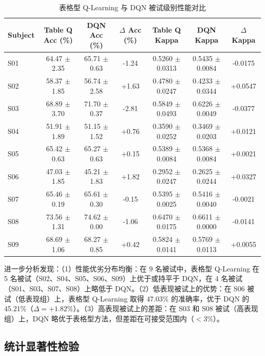 \begin{table}[H]
\centering
\caption{表格型 Q-Learning 与 DQN 被试级别性能对比}
\label{tab:subject_comparison}
\small
\begin{tabular}{lcccccc}
\hline
\textbf{Subject} & \textbf{Table Q Acc (\%)} & \textbf{DQN Acc (\%)} & \textbf{$\Delta$ Acc (\%)} & \textbf{Table Q Kappa} & \textbf{DQN Kappa} & \textbf{$\Delta$ Kappa} \\
\hline
S01 & 64.47 $\pm$ 2.35 & 65.71 $\pm$ 0.63 & -1.24 & 0.5260 $\pm$ 0.0313 & 0.5435 $\pm$ 0.0084 & -0.0175 \\
S02 & 58.37 $\pm$ 1.85 & 56.74 $\pm$ 2.58 & +1.63 & 0.4780 $\pm$ 0.0247 & 0.4233 $\pm$ 0.0344 & +0.0547 \\
S03 & 68.89 $\pm$ 3.70 & 71.70 $\pm$ 0.37 & -2.81 & 0.5849 $\pm$ 0.0493 & 0.6226 $\pm$ 0.0049 & -0.0377 \\
S04 & 51.91 $\pm$ 1.89 & 51.15 $\pm$ 1.52 & +0.76 & 0.3590 $\pm$ 0.0252 & 0.3469 $\pm$ 0.0203 & +0.0121 \\
S05 & 65.42 $\pm$ 0.63 & 65.27 $\pm$ 0.63 & +0.15 & 0.5389 $\pm$ 0.0084 & 0.5368 $\pm$ 0.0084 & +0.0021 \\
S06 & 47.03 $\pm$ 1.85 & 45.21 $\pm$ 1.83 & +1.82 & 0.2952 $\pm$ 0.0247 & 0.2625 $\pm$ 0.0244 & +0.0327 \\
S07 & 65.46 $\pm$ 0.19 & 65.61 $\pm$ 0.30 & -0.15 & 0.5395 $\pm$ 0.0025 & 0.5416 $\pm$ 0.0040 & -0.0021 \\
S08 & 73.56 $\pm$ 1.31 & 74.62 $\pm$ 0.00 & -1.06 & 0.6470 $\pm$ 0.0175 & 0.6611 $\pm$ 0.0000 & -0.0141 \\
S09 & 68.69 $\pm$ 1.06 & 68.27 $\pm$ 0.85 & +0.42 & 0.5824 $\pm$ 0.0141 & 0.5769 $\pm$ 0.0113 & +0.0055 \\
\hline
\end{tabular}
\end{table}

进一步分析发现：（1）性能优劣分布均衡：在 9 名被试中，表格型 Q-Learning 在 5 名被试（S02、S04、S05、S06、S09）上优于或持平于 DQN，在 4 名被试（S01、S03、S07、S08）上略低于 DQN。（2）低表现被试上的优势：在 S06 被试（低表现组）上，表格型 Q-Learning 取得 47.03\% 的准确率，优于 DQN 的 45.21\%（$\Delta = +1.82\%$）。（3）高表现被试上的差距：在 S03 和 S08 被试（高表现组）上，DQN 略优于表格型方法，但差距在可接受范围内（$< 3\%$）。

\subsection{统计显著性检验}
\label{subsec:statistical_test}

